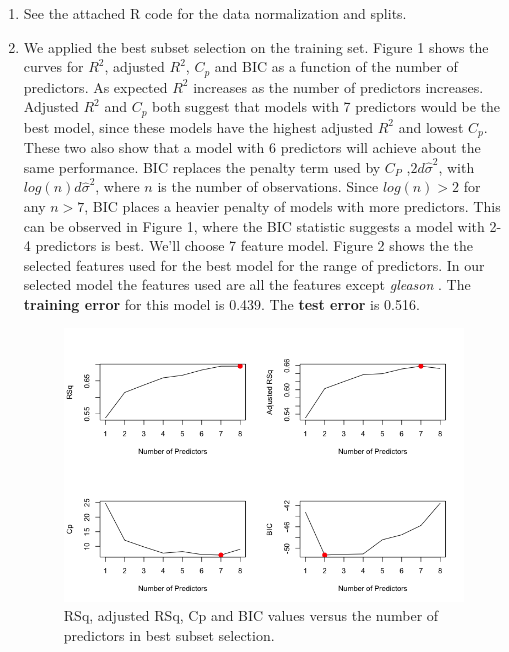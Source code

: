 \begin{enumerate}
\item See the attached R code for the data normalization and splits.
\item We applied the best subset selection on the training set. Figure 1 shows the curves for $R^2$, adjusted $R^2$, $C_p$ and BIC as a function of the number of predictors. As expected $R^2$ increases as the number of predictors increases. Adjusted $R^2$ and $C_p$ both suggest that models with 7 predictors would be the best model, since these models have the highest adjusted $R^2$ and lowest $C_p$. These two also show that a model with 6 predictors will achieve about the same performance. BIC replaces the penalty term used by $C_P$ ,$2d\hat{\sigma}^2$, with $log(n)d\hat{\sigma}^2$, where $n$ is the number of observations. Since $log(n) > 2$ for any $n >7$, BIC places a heavier penalty of models with more predictors. This can be observed in Figure 1, where the BIC statistic suggests a model with 2-4 predictors is best.  We'll choose 7 feature model. Figure 2 shows the the selected features used for the best model for the range of predictors. In our selected model the features used are all the features except \textit{gleason} .  The \textbf{training error} for this model is 0.439. The \textbf{test error} is 0.516. 
\newline
\begin{figure}[htbp]
\centering
\includegraphics[scale=0.7]{Best_subset.png}
\caption{RSq, adjusted RSq, Cp and BIC values versus the number of predictors in best subset selection.}
\end{figure}
\newline
\begin{figure}[htbp]

\end{figure}
\end{enumerate}
